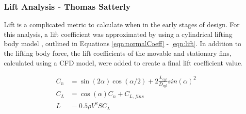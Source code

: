 \subsubsection{Lift Analysis - Thomas Satterly}

Lift is a complicated metric to calculate when in the early stages of design. For this analysis, a lift coefficient was approximated by using a cylindrical lifting body model \cite{fleeman_2001}, outlined in Equations \ref{eqn:normalCoeff} - \ref{eqn:lift}. In addition to the lifting body force, the lift coefficients of the movable and stationary fins, calculated using a CFD model, were added to create a final lift coefficient value. 

\begin{align}
    C_n &= \sin(2\alpha)\cos(\alpha/2) + 2 \frac{L_{cyl}}{D_{cyl}}sin(\alpha)^2
    \label{eqn:normalCoeff}\\
    C_L &= \cos(\alpha)C_n + C_{L, fins}
    \label{eqn:liftCoeff}\\
    L &= 0.5\rho V^2 S C_L
    \label{eqn:lift}
\end{align}
